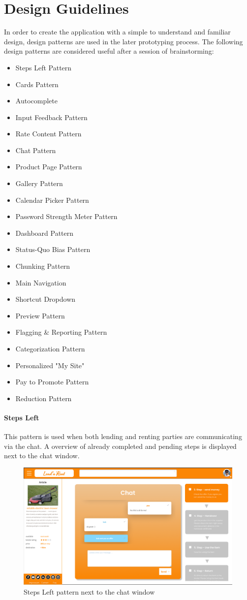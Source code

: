 \section{Design Guidelines}
	In order to create the application with a simple to understand and familiar design, design patterns are used in the later prototyping process. The following design patterns are considered useful after a session of brainstorming:
	
	\begin{itemize}
		\item Steps Left Pattern
		\item Cards Pattern
		\item Autocomplete	
		\item Input Feedback Pattern
		\item Rate Content Pattern
		\item Chat Pattern
		\item Product Page Pattern
		\item Gallery Pattern
		\item Calendar Picker Pattern
		\item Password Strength Meter Pattern
		\item Dashboard Pattern
		\item Status-Quo Bias Pattern
		\item Chunking Pattern
		\item Main Navigation
		\item Shortcut Dropdown
		
		\item Preview Pattern
		\item Flagging \& Reporting Pattern
		\item Categorization Pattern
		\item Personalized "My Site"
		\item Pay to Promote Pattern
		\item Reduction Pattern
	\end{itemize}

	\paragraph{Steps Left}
		This pattern is used when both lending and renting parties are communicating via the chat. A overview of already completed and pending steps is displayed next to the chat window.
		
		\begin{figure}[H]
			\centering
			\includegraphics[width=0.5\linewidth]{abb/3_design_guidelines/stepsleft.png}
			\caption{Steps Left pattern next to the chat window}
			\label{fig:stepsleft}
			\centering
		\end{figure}
	\par
	
